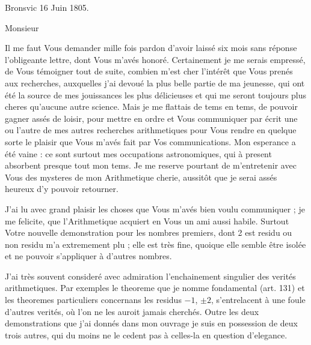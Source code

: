 \documentclass[11pt,a4paper]{article}
\begin{document}
Bronsvic 16 Juin 1805.

Monsieur

Il me faut Vous demander mille fois pardon d'avoir laissé six mois sans
réponse l'obligeante lettre, dont Vous m'avés honoré. Certainement je me
serais empressé, de Vous témoigner tout de suite, combien m'est cher l'intérêt
que Vous prenés aux recherches, auxquelles j'ai devoué la plus belle partie de
ma jeunesse, qui ont été la source de mes jouissances les plus délicieuses et
qui me seront toujours plus cheres qu'aucune autre science. Mais je me
flattais de tems en tems, de pouvoir gagner assés de loisir, pour mettre en
ordre et Vous communiquer par écrit une ou l'autre de mes autres recherches
arithmetiques pour Vous rendre en quelque sorte le plaisir que Vous m'avés
fait par Vos communications. Mon esperance a été vaine : ce sont surtout mes
occupations astronomiques, qui à present absorbent presque tout mon tems. Je
me reserve pourtant de m'entretenir avec Vous des mysteres de mon Arithmetique
cherie, aussitôt que je serai assés heureux d'y pouvoir retourner.

J'ai lu avec grand plaisir les choses que Vous m'avés bien voulu communiquer ;
je me felicite, que l'Arithmetique acquiert en Vous un ami aussi habile.
Surtout Votre nouvelle demonstration pour les nombres premiers, dont 2 est
residu ou non residu m'a extremement plu ; elle est très fine, quoique elle
semble être isolée et ne pouvoir s'appliquer à d'autres nombres.


J'ai très souvent consideré avec admiration l'enchainement singulier des
verités arithmetiques. Par exemples le theoreme que je nomme fondamental (art.
131) et les theoremes particuliers concernans les residus $-1$, $\pm 2$,
s'entrelacent à une foule d'autres verités, où l'on ne les auroit jamais
cherchés. Outre les deux demonstrations que j'ai donnés dans mon ouvrage je
suis en possession de deux  trois autres, qui du moins ne le cedent
pas à celles-la en question d'elegance.
\end{document}

